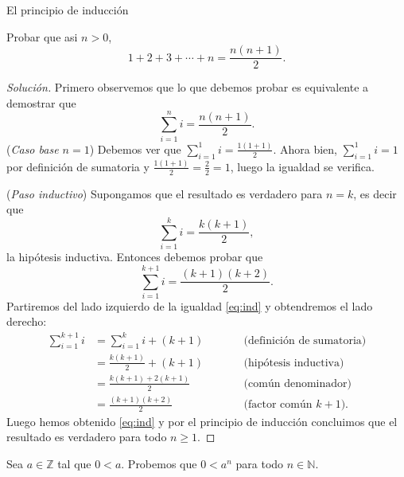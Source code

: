 \begin{section}{El principio de inducción}
\begin{ejemplo*} Probar  que asi $n > 0$,  
    \begin{equation*}
        1 +  2 + 3 +\cdots + n = \frac{n(n+1)}{2}.
    \end{equation*}
    \begin{proof}[Solución] Primero observemos que lo que debemos probar es equivalente a demostrar que
        \begin{equation*}
            \sum_{i=1}^n i = \frac{n(n+1)}{2}.
        \end{equation*}
    \noindent(\textit{Caso  base $n=1$}) Debemos ver que $\sum_{i=1}^1 i = \frac{1(1+1)}{2}$. Ahora bien, $\sum_{i=1}^1 i = 1$ por definición de sumatoria y $\frac{1(1+1)}{2} = \frac22 = 1$, luego la igualdad se verifica.
        
        \noindent (\textit{Paso  inductivo}) Supongamos que el resultado es verdadero para $n=k$, es decir que 
        \begin{equation}
            \sum_{i=1}^k i = \frac{k(k+1)}{2}, \tag{HI}
        \end{equation}
        la hipótesis inductiva. Entonces debemos probar que 
        \begin{equation}
            \sum_{i=1}^{k+1} i = \frac{(k+1)(k+2)}{2} . \label{eq:ind}
        \end{equation}
        Partiremos del lado izquierdo de la igualdad \eqref{eq:ind} y obtendremos el lado derecho:
        \begin{align*}
                \sum_{i=1}^{k+1} i  &= \sum_{i=1}^k i + (k+1) &\qquad  &\text{(definición de sumatoria)} \\
                &=  \frac{k(k+1)}{2} + (k+1)&\qquad &\text{(hipótesis inductiva)} \\
                &=  \frac{k(k+1) + 2(k+1)}{2} &\qquad  & \text{(común denominador)} \\ 
                &=  \frac{(k+1)(k+2)}{2} &\qquad  & \text{(factor común $k+1$)}.
        \end{align*}
        Luego hemos obtenido  \eqref{eq:ind} y por el principio de inducción concluimos que el resultado es verdadero para todo $n\ge 1$.
    \end{proof}
    \end{ejemplo*}

\begin{ejemplo*}Sea $a\in \mathbb Z$ tal que $0<a$. Probemos que $0<a^n$ para todo $n \in \mathbb N$.


\end{ejemplo*}
\end{section}
